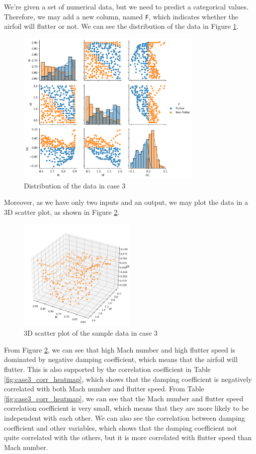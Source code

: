 \documentclass[conf]{new-aiaa}
\begin{document}
We're given a set of numerical data, but we need to predict a categorical values. Therefore, we may add a new column, named \texttt{F}, which indicates whether the airfoil will flutter or not. We can see the distribution of the data in Figure \ref{fig:case3_data_dist}.
\begin{figure}
    \centering
    \includegraphics[width=0.8\textwidth]{graph/case3_data_dist_hue.png}
    \caption{Distribution of the data in case 3}
    \label{fig:case3_data_dist}
\end{figure}
Moreover, as we have only two inputs and an output, we may plot the data in a 3D scatter plot, as shown in Figure \ref{fig:case3_3d_scatter}.
\begin{figure}
    \centering
    \includegraphics[width=0.5\textwidth]{graph/case3_3d_scatter.png}
    \caption{3D scatter plot of the sample data in case 3}
    \label{fig:case3_3d_scatter}
\end{figure}
From Figure \ref{fig:case3_3d_scatter}, we can see that high Mach number and high flutter speed is dominated by negative damping coefficient, which means that the airfoil will flutter. This is also supported by the correlation coefficient in Table \ref{fig:case3_corr_heatmap}, which shows that the damping coefficient is negatively correlated with both Mach number and flutter speed. From Table \ref{fig:case3_corr_heatmap}, we can see that the Mach number and flutter speed correlation coefficient is very small, which means that they are more likely to be independent with each other. We can also see the correlation between damping coefficient and other variables, which shows that the damping coefficient not quite correlated with the others, but it is more correlated with flutter speed than Mach number.
\end{document}
